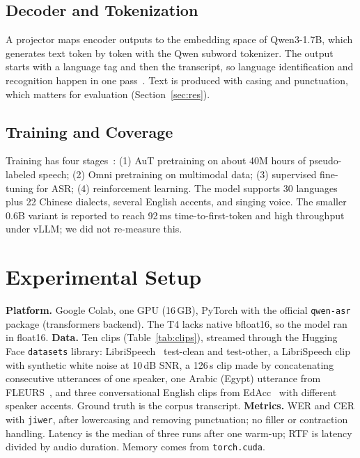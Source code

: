 \documentclass[conference]{IEEEtran}
\begin{document}
\subsection{Decoder and Tokenization}
A projector maps encoder outputs to the embedding space of Qwen3-1.7B, which generates text token by token with the Qwen subword tokenizer. The output starts with a language tag and then the transcript, so language identification and recognition happen in one pass~\cite{qwen3asr}. Text is produced with casing and punctuation, which matters for evaluation (Section~\ref{sec:res}).
\subsection{Training and Coverage}
Training has four stages~\cite{qwen3asr}: (1) AuT pretraining on about 40M hours of pseudo-labeled speech; (2) Omni pretraining on multimodal data; (3) supervised fine-tuning for ASR; (4) reinforcement learning. The model supports 30 languages plus 22 Chinese dialects, several English accents, and singing voice. The smaller 0.6B variant is reported to reach 92\,ms time-to-first-token and high throughput under vLLM; we did not re-measure this.

\section{Experimental Setup}
\textbf{Platform.} Google Colab, one \hwname{} GPU (16\,GB), PyTorch with the official \texttt{qwen-asr} package (transformers backend). The T4 lacks native bfloat16, so the model ran in float16.
\textbf{Data.} Ten clips (Table~\ref{tab:clips}), streamed through the Hugging Face \texttt{datasets} library: LibriSpeech~\cite{librispeech} test-clean and test-other, a LibriSpeech clip with synthetic white noise at 10\,dB SNR, a 126\,s clip made by concatenating consecutive utterances of one speaker, one Arabic (Egypt) utterance from FLEURS~\cite{fleurs}, and three conversational English clips from EdAcc~\cite{edacc} with different speaker accents. Ground truth is the corpus transcript.
\textbf{Metrics.} WER and CER with \texttt{jiwer}, after lowercasing and removing punctuation; no filler or contraction handling. Latency is the median of three runs after one warm-up; RTF is latency divided by audio duration. Memory comes from \texttt{torch.cuda}.
\end{document}
